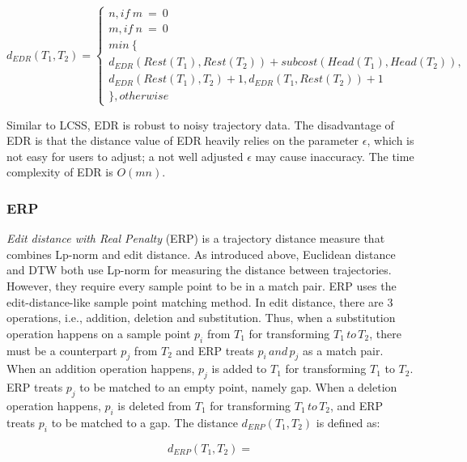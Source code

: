 \documentclass[a4paper, 12pt]{article}
\begin{document}
\begin{equation} \label{eq4}
    d_{EDR}(T_{1}, T_{2}) = \begin{cases}
                                n, if \:m\:=\:0 \\
                                m, if \:n\:=\:0 \\
                                min\:\{ \\ 
                                d_{EDR}(Rest(T_{1}),Rest(T_{2})) + subcost(Head(T_{1}), Head(T_{2})), \\
                                d_{EDR}(Rest(T_{1}), T_{2}) + 1, d_{EDR}(T_{1}, Rest(T_{2})) + 1 \\
                                \}, otherwise
                            \end{cases}
\end{equation}

Similar to LCSS, EDR is robust to noisy trajectory data. The disadvantage of EDR is that the distance value of EDR heavily relies on the parameter $\epsilon$, which is not easy for users to adjust; a not well adjusted $\epsilon$ may cause inaccuracy. The time complexity of EDR is $O(mn)$.

\subsubsection{ERP}
\textit{Edit distance with Real Penalty} (ERP) is a trajectory distance measure that combines Lp-norm and edit distance. As introduced above, Euclidean distance and DTW both use Lp-norm for measuring the distance between trajectories. However, they require every sample point to be in a match pair. ERP uses the edit-distance-like sample point matching method. In edit distance, there are 3 operations, i.e., addition, deletion and substitution. Thus, when a substitution operation happens on a sample point $p_{i}$ from $T_{1}$ for transforming $T_{1}\,to\,T_{2}$, there must be a counterpart $p_{j}$ from $T_{2}$ and ERP treats $p_{i}\,and\,p_{j}$ as a match pair. When an addition operation happens, $p_{j}$ is added to $T_{1}$ for transforming $T_{1}$ to $T_{2}$. ERP treats $p_{j}$ to be matched to an empty point, namely gap. When a deletion operation happens, $p_{i}$ is deleted from $T_{1}$ for transforming $T_{1}\,to\,T_{2}$, and ERP treats $p_{i}$ to be matched to a gap. The distance $d_{ERP}(T_{1},T_{2})$ is defined as:

\begin{equation} \label{eq5}
    d_{ERP}(T_{1},T_{2}) = 
\end{equation}
\end{document}
